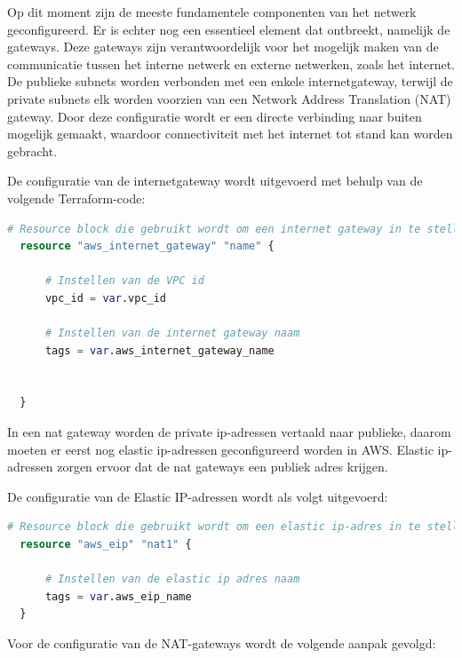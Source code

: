 \vspace{0.5cm}
Op dit moment zijn de meeste fundamentele componenten van het netwerk geconfigureerd. Er is echter nog een essentieel element dat ontbreekt, namelijk de gateways. Deze gateways zijn verantwoordelijk voor het mogelijk maken van de communicatie tussen het interne netwerk en externe netwerken, zoals het internet. De publieke subnets worden verbonden met een enkele internetgateway, terwijl de private subnets elk worden voorzien van een Network Address Translation (NAT) gateway. Door deze configuratie wordt er een directe verbinding naar buiten mogelijk gemaakt, waardoor connectiviteit met het internet tot stand kan worden gebracht.
\clearpage

De configuratie van de internetgateway wordt uitgevoerd met behulp van de volgende Terraform-code:
\newline

\begin{lstlisting}[language=terraform]  
  # Resource block die gebruikt wordt om een internet gateway in te stellen
  resource "aws_internet_gateway" "name" {
  
      # Instellen van de VPC id
      vpc_id = var.vpc_id
  
      # Instellen van de internet gateway naam
      tags = var.aws_internet_gateway_name
  
    
  }
\end{lstlisting}

\vspace{0.5cm}
In een nat gateway worden de private ip-adressen vertaald naar publieke, daarom moeten er eerst nog elastic ip-adressen geconfigureerd worden in AWS. Elastic ip-adressen zorgen ervoor dat de nat gateways een publiek adres krijgen. 
\newline

De configuratie van de Elastic IP-adressen wordt als volgt uitgevoerd:
\newline

\begin{lstlisting}[language=terraform]  
  # Resource block die gebruikt wordt om een elastic ip-adres in te stellen
  resource "aws_eip" "nat1" {
  
      # Instellen van de elastic ip adres naam
      tags = var.aws_eip_name 
  }
\end{lstlisting}

\vspace{0.5cm}
Voor de configuratie van de NAT-gateways wordt de volgende aanpak gevolgd:
\newline

